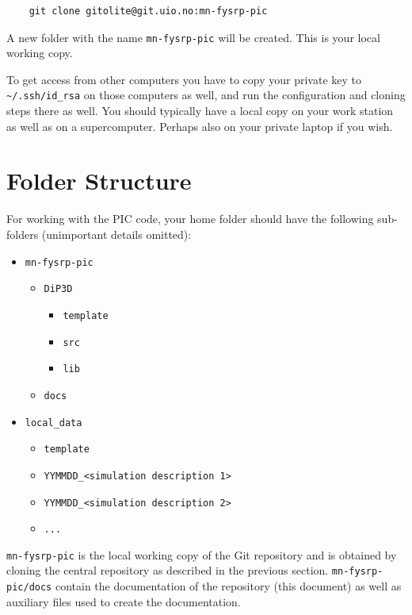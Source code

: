 \documentclass[10pt,a4paper]{article}
\begin{document}
\begin{lstlisting}
	git clone gitolite@git.uio.no:mn-fysrp-pic
\end{lstlisting}
A new folder with the name \lstinline$mn-fysrp-pic$ will be created. This is your local working copy.

To get access from other computers you have to copy your private key to \lstinline$~/.ssh/id_rsa$ on those computers as well, and run the configuration and cloning steps there as well. You should typically have a local copy on your work station as well as on a supercomputer. Perhaps also on your private laptop if you wish.

\section{Folder Structure}
For working with the PIC code, your home folder should have the following sub-folders (unimportant details omitted):

\begin{itemize}
	\item \lstinline$mn-fysrp-pic$
	\begin{itemize}
		\item \lstinline$DiP3D$
		\begin{itemize}
			\item \lstinline$template$
			\item \lstinline$src$
			\item \lstinline$lib$
		\end{itemize}
		\item \lstinline$docs$
	\end{itemize}
	\item \lstinline$local_data$
	\begin{itemize}
		\item \lstinline$template$
		\item \lstinline$YYMMDD_<simulation description 1>$
		\item \lstinline$YYMMDD_<simulation description 2>$
		\item \lstinline$...$
	\end{itemize}
\end{itemize}

\lstinline$mn-fysrp-pic$ is the local working copy of the Git repository and is obtained by cloning the central repository as described in the previous section. \lstinline$mn-fysrp-pic/docs$ contain the documentation of the repository (this document) as well as auxiliary files used to create the documentation.
\end{document}
